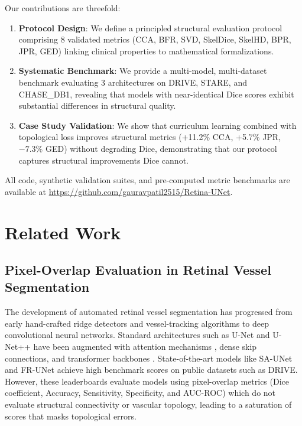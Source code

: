 \documentclass[conference]{IEEEtran}
\begin{document}
Our contributions are threefold:
\begin{enumerate}
    \item \textbf{Protocol Design}: We define a principled structural evaluation protocol comprising 8 validated metrics (CCA, BFR, SVD, SkelDice, SkelHD, BPR, JPR, GED) linking clinical properties to mathematical formalizations.
    \item \textbf{Systematic Benchmark}: We provide a multi-model, multi-dataset benchmark evaluating 3 architectures on DRIVE, STARE, and CHASE\_DB1, revealing that models with near-identical Dice scores exhibit substantial differences in structural quality.
    \item \textbf{Case Study Validation}: We show that curriculum learning combined with topological loss improves structural metrics (+11.2\% CCA, +5.7\% JPR, $-7.3\%$ GED) without degrading Dice, demonstrating that our protocol captures structural improvements Dice cannot.
\end{enumerate}
All code, synthetic validation suites, and pre-computed metric benchmarks are available at \url{https://github.com/gauravpatil2515/Retina-UNet}.

\section{Related Work}
\subsection{Pixel-Overlap Evaluation in Retinal Vessel Segmentation}
The development of automated retinal vessel segmentation has progressed from early hand-crafted ridge detectors and vessel-tracking algorithms \cite{staal2004ridge} to deep convolutional neural networks. Standard architectures such as U-Net \cite{ronneberger2015unet} and U-Net++ \cite{zhou2018unet++} have been augmented with attention mechanisms \cite{oktay2018attention}, dense skip connections, and transformer backbones \cite{chen2021transunet}. State-of-the-art models like SA-UNet \cite{wu2021sa-unet} and FR-UNet \cite{liu2022frunet} achieve high benchmark scores on public datasets such as DRIVE. However, these leaderboards evaluate models using pixel-overlap metrics (Dice coefficient, Accuracy, Sensitivity, Specificity, and AUC-ROC) which do not evaluate structural connectivity or vascular topology, leading to a saturation of scores that masks topological errors.
\end{document}
